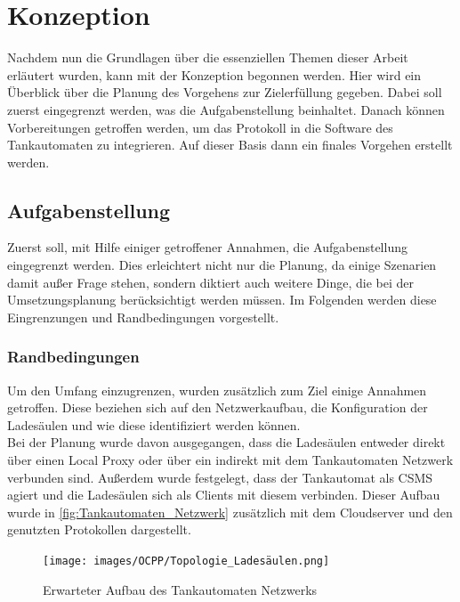 \section{Konzeption}
Nachdem nun die Grundlagen über die essenziellen Themen dieser Arbeit erläutert wurden, kann mit der Konzeption begonnen werden. Hier wird ein Überblick über die Planung des Vorgehens zur Zielerfüllung gegeben. Dabei soll zuerst eingegrenzt werden, was die Aufgabenstellung beinhaltet. Danach können Vorbereitungen getroffen werden, um das Protokoll in die Software des Tankautomaten zu integrieren. Auf dieser Basis dann ein finales Vorgehen erstellt werden.
\subsection{Aufgabenstellung}
Zuerst soll, mit Hilfe einiger getroffener Annahmen, die Aufgabenstellung eingegrenzt werden. Dies erleichtert nicht nur die Planung, da einige Szenarien damit außer Frage stehen, sondern diktiert auch weitere Dinge, die bei der Umsetzungsplanung berücksichtigt werden müssen. Im Folgenden werden diese Eingrenzungen und Randbedingungen vorgestellt.

\subsubsection{Randbedingungen}
Um den Umfang einzugrenzen, wurden zusätzlich zum Ziel einige Annahmen getroffen. Diese beziehen sich auf den Netzwerkaufbau, die Konfiguration der Ladesäulen und wie diese identifiziert werden können.\\

\noindent Bei der Planung wurde davon ausgegangen, dass die Ladesäulen entweder direkt über einen Local Proxy oder über ein  indirekt mit dem Tankautomaten Netzwerk verbunden sind. Außerdem wurde festgelegt, dass der Tankautomat als \ac{CSMS} agiert und die Ladesäulen sich als Clients mit diesem verbinden. Dieser Aufbau wurde in \autoref{fig:Tankautomaten_Netzwerk} zusätzlich mit dem Cloudserver und den genutzten Protokollen dargestellt.

\begin{figure}[H]
	\centering
	\texttt{[image: images/OCPP/Topologie\_Ladesäulen.png]}
	\caption{Erwarteter Aufbau des Tankautomaten Netzwerks\cite{Eigene_Darstellung}}
	\label{fig:Tankautomaten_Netzwerk}
\end{figure}

